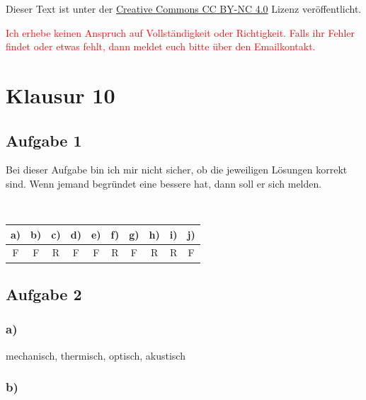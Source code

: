 
\usepackage{paralist}


\maketitle

Dieser Text ist unter der
\href{http://creativecommons.org/licenses/by-nc/4.0/}{Creative Commons CC BY-NC 4.0}
Lizenz veröffentlicht.

\textcolor{red}{%
    Ich erhebe keinen Anspruch auf Vollständigkeit oder Richtigkeit. Falls ihr
    Fehler findet oder etwas fehlt, dann meldet euch bitte über den
    Emailkontakt.
}


\tableofcontents

\newpage


\section{Klausur 10}

\subsection{Aufgabe 1}

Bei dieser Aufgabe bin ich mir nicht sicher, ob die jeweiligen Lösungen korrekt sind. Wenn jemand begründet eine bessere hat, dann soll er sich melden.

\hfill\\

\begin{center}
\begin{tabular}{c|c|c|c|c|c|c|c|c|c}
a) & b) & c) & d) & e) & f) & g) & h) & i) & j) \\ 
\hline 
F & F & R & F & F & R & F & R & R & F \\ 
\end{tabular} 

\end{center}


\subsection{Aufgabe 2}

\subsubsection*{a)}

mechanisch, thermisch, optisch, akustisch

\subsubsection*{b)}

